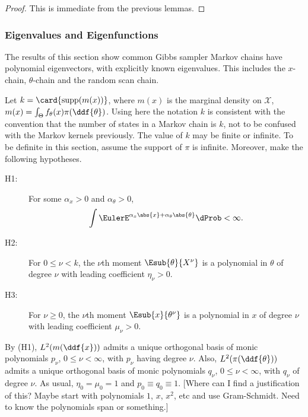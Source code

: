 \documentclass[12pt]{article}
\begin{document}
\begin{proof}
    This is immediate from the previous lemmas.
\end{proof}

\subsubsection*{Eigenvalues and Eigenfunctions}

The results of this section show common Gibbs sampler Markov chains have
polynomial eigenvectors, with explicitly known eigenvalues.  This
includes the \( x \)-chain, \( \theta \)-chain and the random scan
chain.

Let \( k = \card{%
\operatorname{supp}
(m(x))} \), where \( m(x) \) is the marginal density on \( \mathcal{X} \),
\( m(x) = \int_{\Theta} f_{\theta}(x) \pi(\ddf{\theta}) \).  Using here
the notation \( k \) is consistent with the convention that the number
of states in a Markov chain is \( k \), not to be confused with the
Markov kernels previously.  The value of \( k \) may be finite or
infinite.  To be definite in this section, assume the support of \( \pi \)
is infinite.  Moreover, make the following hypotheses.
\begin{description}
    \item[H1:]
        For some \( \alpha_x > 0 \) and \( \alpha_{\theta} >0 \),
        \[
            \int \EulerE^{\alpha_x \abs{x} + \alpha_{\theta} \abs{\theta}}
            \dProb < \infty.
        \]
    \item[H2:]
        For \( 0 \le \nu < k \), the \( \nu \)th moment \( \Esub{\theta}
        {X^\nu} \) is a polynomial in \( \theta \) of degree \( \nu \)
        with leading coefficient \( \eta_{\nu} > 0 \).
    \item[H3:]
        For \( \nu \ge 0 \), the \( \nu \)th moment \( \Esub{x}{\theta^\nu}
        \) is a polynomial in \( x \) of degree \( \nu \) with leading
        coefficient \( \mu_{\nu} > 0 \).
\end{description}

By (H1), \( L^2(m(\ddf{x})) \) admits a unique orthogonal basis of monic
polynomials \( p_{\nu} \), \( 0 \le \nu < \infty \), with \( p_\nu \)
having degree \( \nu \).  Also, \( L^2(\pi(\ddf{\theta})) \) admits a
unique orthogonal basis of monic polynomials \( q_\nu \), \( 0 \le \nu <
\infty \), with \( q_{\nu} \) of degree \( \nu \).  As usual, \( \eta_0
= \mu_0 = 1 \) and \( p_0 \equiv q_0 \equiv 1 \).  [Where can I find a
justification of this?  Maybe start with polynomials \( 1 \), \( x \), \(
x^2 \), etc and use Gram-Schmidt.  Need to know the polynomials span or
something.]
\end{document}
